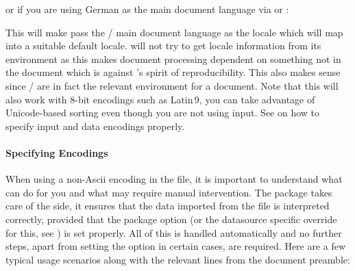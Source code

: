 \documentclass{ltxdockit}[2011/03/25]
\newcommand*{\biber}{\sty{biber}\xspace}
\newcommand*{\biblatex}{\sty{biblatex}\xspace}
\begin{document}
\begin{ltxexample}
\usepackage[sortlocale=de]{biblatex}
\end{ltxexample}
%
or if you are using German as the main document language via  or :

\begin{ltxexample}
\usepackage[sortlocale=auto]{biblatex}
\end{ltxexample}
%
This will make \biblatex pass the / main document language
as the locale which \biber will map into a suitable default locale. \biber
will not try to get locale information from its environment as this makes
document processing dependent on something not in the document which is
against \tex's spirit of reproducibility. This also makes sense since
/ are in fact the relevant environment for a document. Note
that this will also work with 8-bit encodings such as Latin\,9, \ie you can
take advantage of Unicode-based sorting even though you are not using \utf
input. See  on how to specify input and data
encodings properly.

\paragraph{Specifying Encodings}
\label{bib:cav:enc:enc}
When using a non-Ascii encoding in the  file, it is important to understand what \biblatex can do for you and what may require manual intervention. The package takes care of the \latex side, \ie it ensures that the data imported from the  file is interpreted correctly, provided that the  package option (or the datasource specific override for this, see ) is set properly. All of this is handled automatically and no further steps, apart from setting the  option in certain cases, are required. Here are a few typical usage scenarios along with the relevant lines from the document preamble:
\end{document}
